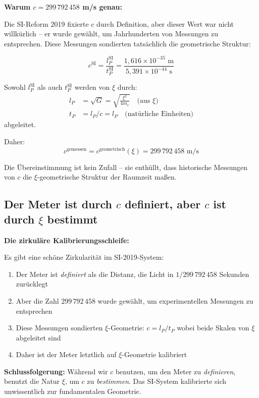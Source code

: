 \documentclass[12pt,a4paper]{article}
\begin{document}
	\begin{keyresult}
		\textbf{Warum $c = 299\,792\,458$ m/s genau:}
		
		Die SI-Reform 2019 fixierte $c$ durch Definition, aber dieser Wert war nicht willk{\"u}rlich -- er wurde gew{\"a}hlt, um Jahrhunderten von Messungen zu entsprechen. Diese Messungen sondierten tats{\"a}chlich die geometrische Struktur:
		
		\begin{equation}
			c^{\text{SI}} = \frac{l_P^{\text{SI}}}{t_P^{\text{SI}}} = \frac{1{,}616 \times 10^{-35} \text{ m}}{5{,}391 \times 10^{-44} \text{ s}}
		\end{equation}
		
		Sowohl $l_P^{\text{SI}}$ als auch $t_P^{\text{SI}}$ werden von $\xi$ durch:
		\begin{align}
			l_P &= \sqrt{G} = \sqrt{\frac{\xi^2}{4m_e}} \quad \text{(aus } \xi\text{)} \\
			t_P &= l_P/c = l_P \quad \text{(nat{\"u}rliche Einheiten)}
		\end{align}
		abgeleitet.
		
		Daher:
		\begin{equation}
			\boxed{c^{\text{gemessen}} = c^{\text{geometrisch}}(\xi) = 299\,792\,458 \text{ m/s}}
		\end{equation}
		
		Die {\"U}bereinstimmung ist kein Zufall -- sie enth{\"u}llt, dass historische Messungen von $c$ die $\xi$-geometrische Struktur der Raumzeit ma{\ss}en.
	\end{keyresult}
	
	\subsection{Der Meter ist durch $c$ definiert, aber $c$ ist durch $\xi$ bestimmt}
	
	\begin{insight}
		\textbf{Die zirkul{\"a}re Kalibrierungsschleife:}
		
		Es gibt eine sch{\"o}ne Zirkularit{\"a}t im SI-2019-System:
		
		\begin{enumerate}
			\item Der Meter ist \emph{definiert} als die Distanz, die Licht in $1/299\,792\,458$ Sekunden zur{\"u}cklegt
			\item Aber die Zahl $299\,792\,458$ wurde gew{\"a}hlt, um experimentellen Messungen zu entsprechen
			\item Diese Messungen sondierten $\xi$-Geometrie: $c = l_P/t_P$ wobei beide Skalen von $\xi$ abgeleitet sind
			\item Daher ist der Meter letztlich auf $\xi$-Geometrie kalibriert
		\end{enumerate}
		
		\textbf{Schlussfolgerung:} W{\"a}hrend wir $c$ benutzen, um den Meter zu \emph{definieren}, benutzt die Natur $\xi$, um $c$ zu \emph{bestimmen}. Das SI-System kalibrierte sich unwissentlich zur fundamentalen Geometrie.
	\end{insight}
	
\end{document}
